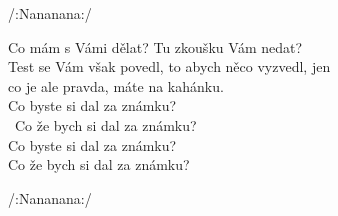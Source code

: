 \cho{}

\re{}
/:Nananana:/

Co mám s Vámi dělat? Tu zkoušku Vám nedat?\\
Test se Vám však povedl, to abych něco vyzvedl, jen\\
co je ale pravda, máte na kahánku.\\
Co byste si dal za známku?\\\
Co že bych si dal za známku?\\
Co byste si dal za známku?\\
\ch{A}Co že bych si dal za známku?

\cho{}

\re{}
/:Nananana:/

\esong{}